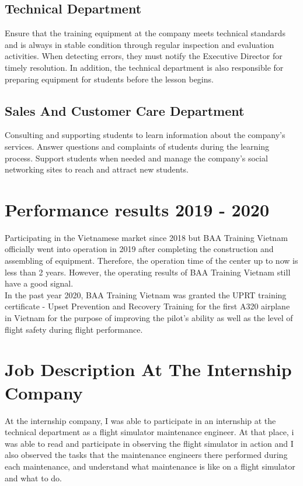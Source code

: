     \subsection{Technical Department}
        Ensure that the training equipment at the company meets technical standards and is always in stable condition through regular inspection and 
        evaluation activities. When detecting errors, they must notify the Executive Director for timely resolution. In addition, the technical department 
        is also responsible for preparing equipment for students before the lesson begins.
    \subsection{Sales And Customer Care Department}
        Consulting and supporting students to learn information about the company's services. Answer questions and complaints of students during the learning 
        process. Support students when needed and manage the company's social networking sites to reach and attract new students.

\section{Performance results 2019 - 2020}
    Participating in the Vietnamese market since 2018 but BAA Training Vietnam officially went into operation in 2019 after completing the construction 
    and assembling of equipment. Therefore, the operation time of the center up to now is less than 2 years. However, the operating results of BAA 
    Training Vietnam still have a good signal. \\ 
    \vspace{3mm}
    In the past year 2020, BAA Training Vietnam was granted the UPRT training certificate - Upset Prevention and Recovery Training for the first A320 
    airplane in Vietnam for the purpose of improving the pilot's ability as well as the level of flight safety during flight performance.

\section{Job Description At The Internship Company}
    At the internship company, I was able to participate in an internship at the technical department as a flight simulator maintenance engineer. At that place, 
    i was able to read and participate in observing the flight simulator in action and I also observed the tasks that the maintenance engineers there performed 
    during each maintenance, and understand what maintenance is like on a flight simulator and what to do.